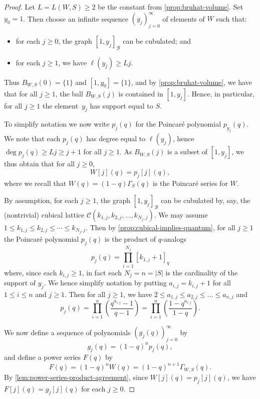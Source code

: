 \documentclass[11pt]{amsart}
\theoremstyle{plain}
\theoremstyle{definition}
\newcommand{\cC}{\mathcal{C}}
\newcommand{\cB}{\mathcal B}
\newcommand{\G}{\Gamma} %
\numberwithin{equation}{subsection}
\begin{document}
\begin{proof}
	Let $L = L(W,S) \geq 2$ be the constant from \cref{prop:bruhat-volume}. Set $y_0 = 1$.
	Then choose an infinite sequence $(y_j)_{j=0}^\infty$ of elements of $W$ such that:
	\begin{itemize}
		\item for each $j \geq 0$, the graph $[1,y_j]_\cB$ can be cubulated; and
		\item for each $j \geq 1$, we have $\ell(y_j) \geq L j$.
	\end{itemize}
Thus $B_{W,S}(0) = \{ 1\}$ and $[1,y_0] = \{1\}$, and by \cref{prop:bruhat-volume}, we have that for all $j \geq 1$, the ball $B_{W,S}(j)$ is contained in $[1,y_j]$. Hence, in particular, for all $j \geq 1$ the element~$y_j$ has support equal to $S$.
	
	To simplify notation we now write $p_j(q)$ for the Poincar\'e polynomial $p_{y_j}(q)$.
We note that each $p_j(q)$ has degree equal to $\ell(y_j)$, hence $\deg p_j(q) \geq L j \geq j+1$ for all $j \geq 1$. 
 As $B_{W,S}(j)$ is a subset of $[1,y_j]$, we thus obtain that for all $j \geq 0$, \[ W[j](q) = p_j[j](q), \]
	where we recall %
  that $W(q) = (1-q)\G_S(q)$ is the Poincar\'e series for $W$. 
	
	By assumption, for each $j \geq 1$, the graph $[1,y_j]_\cB$ can be cubulated by, say, the (nontrivial) cubical lattice $\cC(k_{1,j}, k_{2,j}, \dots, k_{N_j,j})$. We may assume $1 \leq k_{1,j} \leq k_{2,j} \leq \cdots \leq k_{N_j,j}$.
	Then by \cref{prop:cubical-implies-quantum}, for all $j \geq 1$ the Poincar\'e polynomial $p_j(q)$ is the product of %
  $q$-analogs
	\[
	p_j(q) = 
  \prod_{i=1}^{N_j} [k_{1,j} + 1]_q
	\]
	where, since each $k_{i,j} \geq 1$, in fact each $N_j = n = |S|$ is the cardinality of the support of $y_j$.  We hence simplify notation by putting $a_{i,j} = k_{i,j} + 1$ for all $1 \leq i \leq n$ and $j \geq 1$. Then for all $j \geq 1$, we have $2 \leq a_{1,j} \leq a_{2,j} \leq \dots \leq a_{n,j}$ and 
\[
	p_j(q) =  \prod_{i=1}^n \left( \frac{q^{a_{i,j}} - 1}{q-1} \right) = \prod_{i=1}^n \left( \frac{1 - q^{a_{i,j}} }{1-q} \right).
	\]
	
	We now define a sequence of polynomials $(g_j(q))_{j=0}^\infty$ by
	\[
		g_j(q) = (1-q)^{n} p_j(q),	
	\]
	and define a power series $F(q)$ by 
	\[
		F(q) = (1-q)^{n}W(q) = (1-q)^{n+1}\G_{W,S}(q).
	\]
	By \cref{lem:power-series-product-agreement}, since $W[j](q) = p_j[j](q)$, we have $F[j](q) = g_j[j](q)$ for each $j \geq 0$. 
	

\end{proof}
\end{document}
